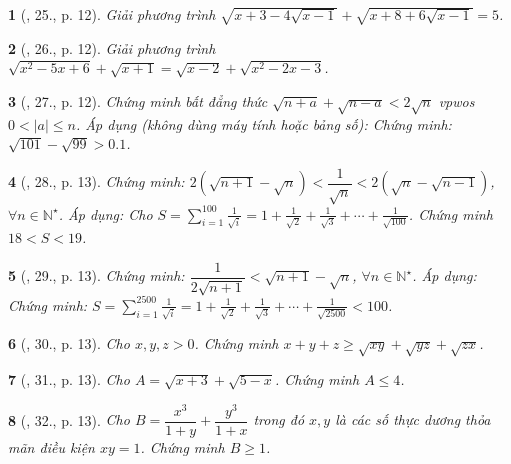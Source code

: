\documentclass{article}
\newtheorem{baitoan}{}%
\begin{document}
\begin{baitoan}[\cite{Tuyen_Toan_9_old}, 25., p. 12]
	Giải phương trình $\sqrt{x + 3 - 4\sqrt{x - 1}} + \sqrt{x + 8 + 6\sqrt{x - 1}} = 5$.
\end{baitoan}

\begin{baitoan}[\cite{Tuyen_Toan_9_old}, 26., p. 12]
	Giải phương trình $\sqrt{x^2 - 5x + 6} + \sqrt{x + 1} = \sqrt{x - 2} + \sqrt{x^2 - 2x - 3}$.
\end{baitoan}

\begin{baitoan}[\cite{Tuyen_Toan_9_old}, 27., p. 12]
	Chứng minh bất đẳng thức $\sqrt{n + a} + \sqrt{n - a} < 2\sqrt{n}$ vpwos $0 < |a|\le n$. Áp dụng (không dùng máy tính hoặc bảng số): Chứng minh: $\sqrt{101} - \sqrt{99} > 0.1$.
\end{baitoan}

\begin{baitoan}[\cite{Tuyen_Toan_9_old}, 28., p. 13]
	Chứng minh: $2(\sqrt{n + 1} - \sqrt{n}) < \dfrac{1}{\sqrt{n}} < 2(\sqrt{n} - \sqrt{n - 1})$, $\forall n\in\mathbb{N}^\star$. Áp dụng: Cho $S = \sum_{i=1}^{100} \frac{1}{\sqrt{i}} = 1 + \frac{1}{\sqrt{2}} + \frac{1}{\sqrt{3}} + \cdots + \frac{1}{\sqrt{100}}$. Chứng minh $18 < S < 19$.
\end{baitoan}

\begin{baitoan}[\cite{Tuyen_Toan_9_old}, 29., p. 13]
	Chứng minh: $\dfrac{1}{2\sqrt{n + 1}} < \sqrt{n + 1} - \sqrt{n}$, $\forall n\in\mathbb{N}^\star$. Áp dụng: Chứng minh: $S = \sum_{i=1}^{2500} \frac{1}{\sqrt{i}} = 1 + \frac{1}{\sqrt{2}} + \frac{1}{\sqrt{3}} + \cdots + \frac{1}{\sqrt{2500}} < 100$.
\end{baitoan}

\begin{baitoan}[\cite{Tuyen_Toan_9_old}, 30., p. 13]
	Cho $x,y,z > 0$. Chứng minh $x + y + z\ge\sqrt{xy} + \sqrt{yz} + \sqrt{zx}$.
\end{baitoan}

\begin{baitoan}[\cite{Tuyen_Toan_9_old}, 31., p. 13]
	Cho $A = \sqrt{x + 3} + \sqrt{5 - x}$. Chứng minh $A\le4$.
\end{baitoan}

\begin{baitoan}[\cite{Tuyen_Toan_9_old}, 32., p. 13]
	Cho $B = \dfrac{x^3}{1 + y} + \dfrac{y^3}{1 + x}$ trong đó $x,y$ là các số thực dương thỏa mãn điều kiện $xy = 1$. Chứng minh $B\ge1$.
\end{baitoan}
\end{document}
